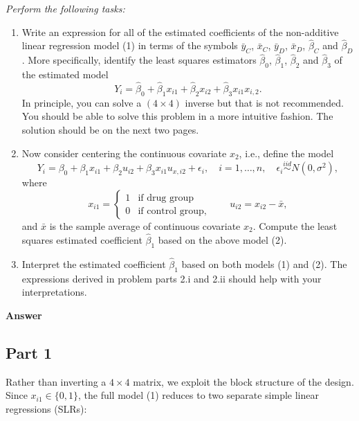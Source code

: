 \documentclass[letterpaper]{article}
\begin{document}
	\textit{Perform the following tasks:}

\begin{enumerate}
	\item Write an expression for all of the estimated coefficients of the non-additive linear regression model (1) in terms of the symbols $\bar{y}_C$, $\bar{x}_C$, $\bar{y}_D$, $\bar{x}_D$, $\hat{\beta}_C$ and $\hat{\beta}_D$. More specifically, identify the least squares estimators $\hat{\beta}_0$, $\hat{\beta}_1$, $\hat{\beta}_2$ and $\hat{\beta}_3$ of the estimated model
	\[
	Y_i = \hat{\beta}_0 + \hat{\beta}_1 x_{i1} + \hat{\beta}_2 x_{i2} + \hat{\beta}_3 x_{i1} x_{i,2}.
	\]
	In principle, you can solve a $(4 \times 4)$ inverse but that is not recommended. You should be able to solve this problem in a more intuitive fashion. The solution should be on the next two pages.
	
	\item Now consider centering the continuous covariate $x_2$, i.e., define the model
	\begin{equation}
		Y_i = \beta_0 + \beta_1 x_{i1} + \beta_2 u_{i2} + \beta_3 x_{i1} u_{x,i2} + \epsilon_i, \quad i = 1, \ldots, n, \quad \epsilon_i \overset{iid}{\sim} N(0, \sigma^2),
	\end{equation}
	where
	\[
	x_{i1} = \begin{cases} 1 & \text{if drug group} \\ 0 & \text{if control group,} \end{cases} \qquad u_{i2} = x_{i2} - \bar{x},
	\]
	and $\bar{x}$ is the sample average of continuous covariate $x_2$. Compute the least squares estimated coefficient $\hat{\beta}_1$ based on the above model (2).
	
	\item Interpret the estimated coefficient $\hat{\beta}_1$ based on both models (1) and (2). The expressions derived in problem parts 2.i and 2.ii should help with your interpretations.
\end{enumerate}
	
	\textbf{Answer}
	
	\subsection{Part 1}
	
	Rather than inverting a $4\times 4$ matrix, we exploit the block structure of the design. Since $x_{i1} \in \{0,1\}$, the full model (1) reduces to two separate simple linear regressions (SLRs):
	
\end{document}
